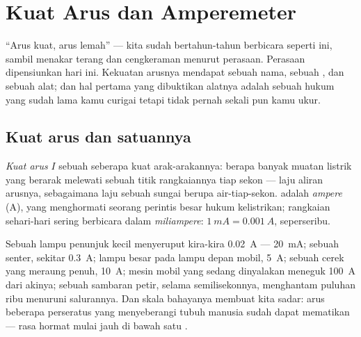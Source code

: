 \chapter{Kuat Arus dan Amperemeter}\label{ch:g8:intensity-ammeter}

``Arus kuat, arus lemah'' --- kita sudah bertahun-tahun berbicara
seperti ini, sambil menakar terang dan cengkeraman menurut perasaan.
Perasaan dipensiunkan hari ini. Kekuatan arusnya mendapat sebuah nama,
sebuah , dan sebuah alat; dan hal pertama yang dibuktikan
alatnya adalah sebuah hukum yang sudah lama kamu curigai tetapi tidak
pernah sekali pun kamu ukur.

\section{Kuat arus dan satuannya}

\begin{definition}\label{def:g8:intensity-ammeter:intensity}
\emph{Kuat arus} $I$ sebuah  
seberapa kuat arak-arakannya: berapa banyak muatan listrik yang
berarak melewati sebuah titik rangkaiannya tiap sekon --- laju aliran
arusnya, sebagaimana laju sebuah sungai berupa air-tiap-sekon.
 adalah \emph{ampere} (\unit{A}), yang
menghormati seorang perintis besar hukum kelistrikan; rangkaian
sehari-hari sering berbicara dalam \emph{miliampere}:
$\qty{1}{mA} = \qty{0.001}{A}$, seperseribu.
\end{definition}

\begin{example}\label{ex:g8:intensity-ammeter:values}
Sebuah lampu penunjuk kecil menyeruput kira-kira \qty{0.02}{A} ---
\qty{20}{mA}; sebuah  senter, sekitar \qty{0.3}{A}; lampu besar
pada lampu depan mobil, \qty{5}{A}; sebuah cerek yang meraung penuh,
\qty{10}{A}; mesin mobil yang sedang dinyalakan meneguk \qty{100}{A}
dari akinya; sebuah sambaran petir, selama semilisekonnya, menghantam
puluhan ribu  menuruni salurannya. Dan skala bahayanya membuat
kita sadar: arus beberapa perseratus  yang menyeberangi tubuh
manusia sudah dapat mematikan --- rasa hormat mulai jauh di bawah satu
.
\end{example}

